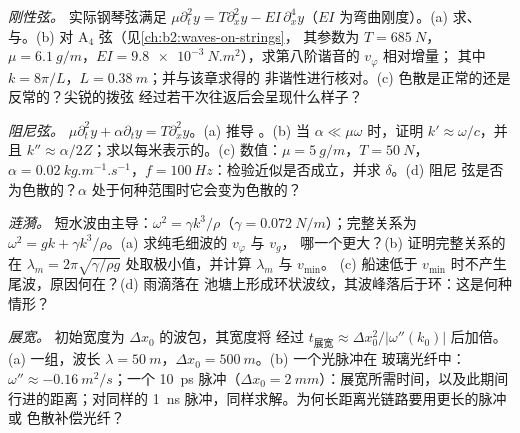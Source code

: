 \begin{exercise}[$\star\star$]\label{exo:b2:dispersion-wave-packets:5}
\emph{刚性弦。} 实际钢琴弦满足 $\mu\partial_t^2y = T\partial_x^2y
- EI\,\partial_x^4y$（$EI$ 为弯曲刚度）。(a) 求、
与。(b) 对 A$_4$ 弦（见\cref{ch:b2:waves-on-strings}，
其参数为 $T = \qty{685}{N}$，$\mu = \qty{6.1}{g/m}$，$EI =
\qty{9.8e-3}{N.m^2}$），求第八阶谐音的 $v_\varphi$ 相对增量；
其中 $k = 8\pi/L$，$L = \qty{0.38}{m}$；并与该章求得的
非谐性进行核对。(c) 色散是正常的还是反常的？尖锐的拨弦
经过若干次往返后会呈现什么样子？
\end{exercise}

\begin{exercise}[$\star\star$]\label{exo:b2:dispersion-wave-packets:6}
\emph{阻尼弦。} $\mu\partial_t^2y + \alpha\partial_ty = T\partial_x^2y$。(a) 推导
。(b) 当 $\alpha \ll \mu\omega$ 时，证明 $k' \approx \omega/c$，并且
$k'' \approx \alpha/2Z$；求以每米表示的。(c) 数值：$\mu =
\qty{5}{g/m}$，$T = \qty{50}{N}$，$\alpha = \qty{0.02}{kg.m^{-1}.s^{-1}}$，$f =
\qty{100}{Hz}$：检验近似是否成立，并求 $\delta$。(d) 阻尼
弦是否为色散的？$\alpha$ 处于何种范围时它会变为色散的？
\end{exercise}

\begin{exercise}[$\star\star$]\label{exo:b2:dispersion-wave-packets:7}
\emph{涟漪。} 短水波由主导：$\omega^2 =
\gamma k^3/\rho$（$\gamma = \qty{0.072}{N/m}$）；完整关系为 $\omega^2 = gk +
\gamma k^3/\rho$。(a) 求纯毛细波的 $v_\varphi$ 与 $v_g$，
哪一个更大？(b) 证明完整关系的
在 $\lambda_m = 2\pi\sqrt{\gamma/\rho g}$ 处取极小值，并计算 $\lambda_m$ 与 $v_{\min}$。
(c) 船速低于 $v_{\min}$ 时不产生尾波，原因何在？(d) 雨滴落在
池塘上形成环状波纹，其波峰落后于环：这是何种情形？
\end{exercise}

\begin{exercise}[$\star\star$]\label{exo:b2:dispersion-wave-packets:8}
\emph{展宽。} 初始宽度为 $\Delta x_0$ 的波包，其宽度将
经过 $t_{\text{展宽}} \approx \Delta x_0^2/|\omega''(k_0)|$ 后加倍。(a) 一组，波长 $\lambda = \qty{50}{m}$，$\Delta x_0 = \qty{500}{m}$。(b) 一个光脉冲在
玻璃光纤中：$\omega'' \approx \qty{-0.16}{m^2/s}$；一个 \qty{10}{ps} 脉冲（$\Delta x_0 =
\qty{2}{mm}$）：展宽所需时间，以及此期间行进的距离；对同样的
\qty{1}{ns} 脉冲，同样求解。为何长距离光链路要用更长的脉冲或
色散补偿光纤？
\end{exercise}

